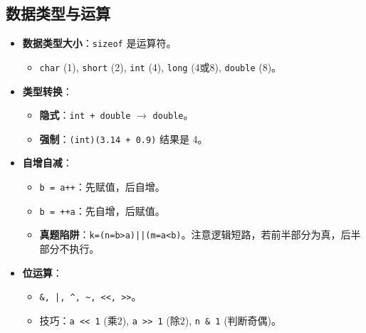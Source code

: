 \documentclass[a4paper,12pt]{article}
\begin{document}
\subsection{数据类型与运算}
\begin{itemize}
    \item \textbf{数据类型大小}：\texttt{sizeof} 是运算符。
    \begin{itemize}
        \item \texttt{char} (1), \texttt{short} (2), \texttt{int} (4), \texttt{long} (4或8), \texttt{double} (8)。
    \end{itemize}
    \item \textbf{类型转换}：
    \begin{itemize}
        \item \textbf{隐式}：\texttt{int + double} $\rightarrow$ \texttt{double}。
        \item \textbf{强制}：\texttt{(int)(3.14 + 0.9)} 结果是 4。
    \end{itemize}
    \item \textbf{自增自减}：
    \begin{itemize}
        \item \texttt{b = a++}：先赋值，后自增。
        \item \texttt{b = ++a}：先自增，后赋值。
        \item \textbf{真题陷阱}：\texttt{k=(n=b>a)||(m=a<b)}。注意逻辑短路，若前半部分为真，后半部分不执行。
    \end{itemize}
    \item \textbf{位运算}：
    \begin{itemize}
        \item \texttt{\&, |, \^{}, \~{}, <<, >>}。
        \item 技巧：\texttt{a << 1} (乘2), \texttt{a >> 1} (除2), \texttt{n \& 1} (判断奇偶)。
    \end{itemize}
\end{itemize}
\end{document}
